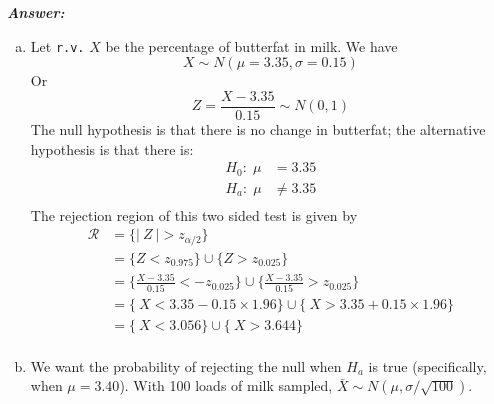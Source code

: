 \documentclass[12pt]{article}
\begin{document}
  \textbf{\color{TealBlue}\emph{Answer:} } 
 \begin{enumerate}[(a)]  
\item Let \texttt{r.v.} $X$ be the percentage of butterfat in milk.  We have
$$
X \sim N(\mu = 3.35, \sigma = 0.15)
$$
Or
$$
Z = \frac{X - 3.35}{0.15} \sim N(0,1)
$$
The null hypothesis is that there is no change in butterfat; the alternative hypothesis is that there is:
\begin{align*}
H_0 : \; \mu &= 3.35 \\
H_a : \; \mu &\neq 3.35\\
\end{align*}
The rejection region of this two sided test is given by 
\begin{align*}
\mathcal{R}  &= \Big\{ |\ Z \ | > z_{\alpha / 2} \Big\}  \\
&= \Big\{ Z < z_{0.975} \Big\} \cup \Big\{ Z >  z_{0.025} \Big\} \\
&= \Big\{  \frac{X - 3.35}{0.15} < - z_{0.025} \Big\}   \cup \Big\{  \frac{X - 3.35}{0.15} >  z_{0.025} \Big\} \\
&= \Big\{  \ X < 3.35 - 0.15 \times 1.96 \Big\}  \cup \Big\{ \ X >  3.35 + 0.15 \times 1.96 \Big\} \\
&= \Big\{  \ X < 3.056  \Big\}  \cup \Big\{ \ X > 3.644 \Big\} \\
\end{align*}

\item We want the probability of rejecting the null when $H_a$ is true (specifically, when $\mu = 3.40$). With 100 loads of milk sampled, $\bar X \sim N(\mu, \sigma / \sqrt{ 100})$.
%


\end{enumerate}
\end{document}
